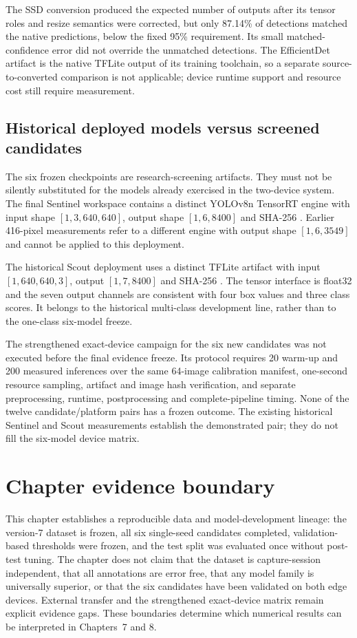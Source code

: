 The SSD conversion produced the expected number of outputs after its tensor
roles and resize semantics were corrected, but only 87.14\% of detections
matched the native predictions, below the fixed 95\% requirement. Its small
matched-confidence error did not override the unmatched detections. The
EfficientDet artifact is the native TFLite output of its training toolchain, so
a separate source-to-converted comparison is not applicable; device runtime
support and resource cost still require measurement.

\subsection{Historical deployed models versus screened candidates}

The six frozen checkpoints are research-screening artifacts. They must not be
silently substituted for the models already exercised in the two-device
system. The final Sentinel workspace contains a distinct YOLOv8n TensorRT
engine with input shape $[1,3,640,640]$, output shape $[1,6,8400]$ and SHA-256
.
Earlier 416-pixel measurements refer to a different engine with output shape
$[1,6,3549]$ and cannot be applied to this deployment.

The historical Scout deployment uses a distinct TFLite artifact with input
$[1,640,640,3]$, output $[1,7,8400]$ and SHA-256
.
The tensor interface is float32 and the seven output channels are consistent
with four box values and three class scores. It belongs to the historical
multi-class development line, rather than to the one-class six-model freeze.

The strengthened exact-device campaign for the six new candidates was not
executed before the final evidence freeze. Its protocol requires 20 warm-up and
200 measured inferences over the same 64-image calibration manifest, one-second
resource sampling, artifact and image hash verification, and separate
preprocessing, runtime, postprocessing and complete-pipeline timing. None of
the twelve candidate/platform pairs has a frozen outcome. The existing
historical Sentinel and Scout measurements establish the demonstrated pair;
they do not fill the six-model device matrix.

\section{Chapter evidence boundary}

This chapter establishes a reproducible data and model-development lineage:
the version-7 dataset is frozen, all six single-seed candidates completed,
validation-based thresholds were frozen, and the test split was evaluated once
without post-test tuning. The chapter does not claim that the dataset is
capture-session independent, that all annotations are error free, that any
model family is universally superior, or that the six candidates have been
validated on both edge devices. External transfer and the strengthened
exact-device matrix remain explicit evidence gaps. These boundaries determine
which numerical results can be interpreted in Chapters~7 and 8.
